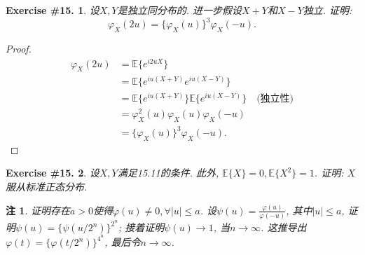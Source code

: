 \documentclass[UTF8, a4paper]{article}
\newtheorem{exercise}{Exercise \#15.}
\newtheorem*{remark}{注}
\begin{document}
\begin{framed}
\begin{exercise}
设\(X,Y\)是独立同分布的. 进一步假设\(X+Y\)和\(X-Y\)独立.
证明: 
$$
\varphi_X(2u) = \{\varphi_X(u)\}^3\varphi_X(-u).
$$
\end{exercise}
\end{framed}

\begin{proof}
\begin{align*}
    \varphi_X(2u) &= \mathbb{E}\{e^{i 2u X}\} \\
    &= \mathbb{E}\{e^{i u (X+Y)}e^{i u (X-Y)}\} \\
    &= \mathbb{E}\{e^{i u (X+Y)}\}\mathbb{E}\{e^{i u (X-Y)}\} \quad \text{(独立性)}\\
    &= \varphi_X^2(u)\varphi_X(u)\varphi_X(-u) \\
    &= \{\varphi_X(u)\}^3\varphi_X(-u).
\end{align*}
\end{proof}


\begin{framed}
\begin{exercise}
设\(X,Y\)满足15.11的条件. 此外, \(\mathbb{E}\{X\} = 0, \mathbb{E}\{X^2\} = 1\).
证明: \(X\)服从标准正态分布.
\end{exercise}
\end{framed}

\begin{remark}
证明存在\(a > 0\)使得\(\varphi(u) \neq 0, \forall |u| \leq a\).
设\(\psi(u) = \frac{\varphi(u)}{\varphi(-u)}\), 其中\(|u| \leq a\), 证明\(\psi(u) = \{\psi(u/2^n)\}^{2^n}\);
接着证明\(\psi(u) \to 1\), 当\(n\to\infty\).
这推导出\(\varphi(t) = \{\varphi(t/2^n)\}^{4^n}\), 最后令\(n\to\infty\).
\end{remark}
\end{document}
